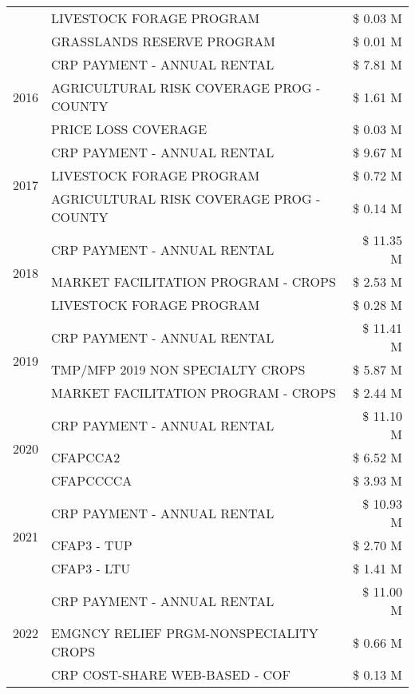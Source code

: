 \begin{tabular}{llr}
 & LIVESTOCK FORAGE PROGRAM & \$ 0.03 M \\
 & GRASSLANDS RESERVE PROGRAM & \$ 0.01 M \\
\cline{1-3}
\multirow[t]{3}{*}{2016} & CRP PAYMENT - ANNUAL RENTAL & \$ 7.81 M \\
 & AGRICULTURAL RISK COVERAGE PROG - COUNTY & \$ 1.61 M \\
 & PRICE LOSS COVERAGE & \$ 0.03 M \\
\cline{1-3}
\multirow[t]{3}{*}{2017} & CRP PAYMENT - ANNUAL RENTAL & \$ 9.67 M \\
 & LIVESTOCK FORAGE PROGRAM & \$ 0.72 M \\
 & AGRICULTURAL RISK COVERAGE PROG - COUNTY & \$ 0.14 M \\
\cline{1-3}
\multirow[t]{3}{*}{2018} & CRP PAYMENT - ANNUAL RENTAL & \$ 11.35 M \\
 & MARKET FACILITATION PROGRAM - CROPS & \$ 2.53 M \\
 & LIVESTOCK FORAGE PROGRAM & \$ 0.28 M \\
\cline{1-3}
\multirow[t]{3}{*}{2019} & CRP PAYMENT - ANNUAL RENTAL & \$ 11.41 M \\
 & TMP/MFP 2019 NON SPECIALTY CROPS & \$ 5.87 M \\
 & MARKET FACILITATION PROGRAM - CROPS & \$ 2.44 M \\
\cline{1-3}
\multirow[t]{3}{*}{2020} & CRP PAYMENT - ANNUAL RENTAL & \$ 11.10 M \\
 & CFAPCCA2 & \$ 6.52 M \\
 & CFAPCCCCA & \$ 3.93 M \\
\cline{1-3}
\multirow[t]{3}{*}{2021} & CRP PAYMENT - ANNUAL RENTAL & \$ 10.93 M \\
 & CFAP3 - TUP & \$ 2.70 M \\
 & CFAP3 - LTU & \$ 1.41 M \\
\cline{1-3}
\multirow[t]{3}{*}{2022} & CRP PAYMENT - ANNUAL RENTAL & \$ 11.00 M \\
 & EMGNCY RELIEF PRGM-NONSPECIALITY CROPS & \$ 0.66 M \\
 & CRP COST-SHARE WEB-BASED - COF & \$ 0.13 M \\
\cline{1-3}
\bottomrule
\end{tabular}

